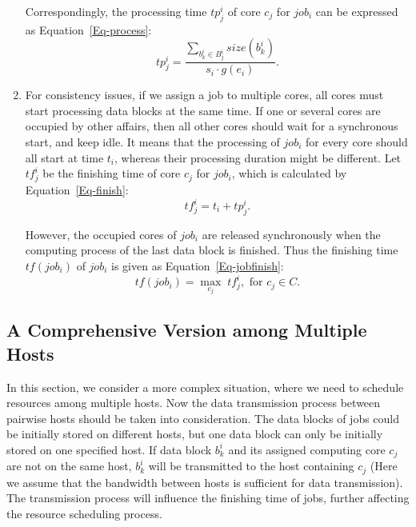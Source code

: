 \documentclass{llncs}
\begin{document}
\begin{enumerate}
		\qquad Correspondingly, the processing time $tp^i_{j}$ of core $c_j$ for $job_i$ can be expressed as Equation~\eqref{Eq-process}:
		\begin{equation} \label{Eq-process}
			tp^i_{j} = \frac{\sum_{b^i_{k} \in B^i_{j}}size(b^i_{k})}{s_i \cdot g(e_i)}.
		\end{equation} 
		
		\vspace{2mm}
		
		\item For consistency issues, if we assign a job to multiple cores, all cores must start processing data blocks at the same time. If one or several cores are occupied by other affairs, then all other cores should wait for a synchronous start, and keep idle. It means that the processing of $job_i$ for every core should all start at time $t_i$, whereas their processing duration might be different. Let $tf^i_{j}$ be the finishing time of core $c_j$ for $job_i$, which is calculated by Equation~\eqref{Eq-finish}:
		\begin{equation} \label{Eq-finish}
			tf^i_{j} = t_i + tp^i_{j}.
		\end{equation}   
		
		However, the occupied cores of $job_i$ are released synchronously when the computing process of the last data block is finished. Thus the finishing time $tf(job_i)$ of $job_i$ is given as Equation~\eqref{Eq-jobfinish}:
		\begin{equation} \label{Eq-jobfinish}
			tf(job_i) = \max_{c_j} \; tf^i_{j}, \text{ for } c_j \in C.
		\end{equation} 
	\end{enumerate}
	
	\subsection{A Comprehensive Version among Multiple Hosts} \label{subsec-task2}
	
	In this section, we consider a more complex situation, where we need to schedule resources among multiple hosts. Now the data transmission process between pairwise hosts should be taken into consideration. The data blocks of jobs could be initially stored on different hosts, but one data block can only be initially stored on one specified host. If data block $b^i_{k}$ and its assigned computing core $c_j$ are not on the same host, $b^i_{k}$ will be transmitted to the host containing $c_j$ (Here we assume that the bandwidth between hosts is sufficient for data transmission). The transmission process will influence the finishing time of jobs, further affecting the resource scheduling process.
	
\end{document}
